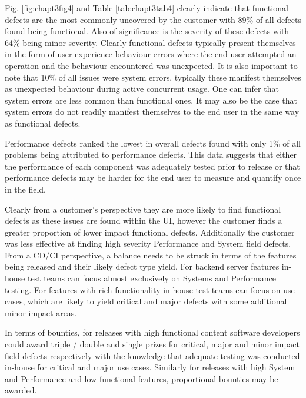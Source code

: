 Fig. \ref{fig:chapt3fig4} and Table \ref{tab:chapt3tab4} clearly indicate that functional defects are the most commonly uncovered by the customer with 89\% of all defects found being functional. Also of significance is the severity of these defects with 64\% being minor severity. Clearly functional defects typically present themselves in the form of user experience behaviour errors where the end user attempted an operation and the behaviour encountered was unexpected. It is also important to note that 10\% of all issues were system errors, typically these manifest themselves as unexpected behaviour during active concurrent usage. One can infer that system errors are less common than functional ones. It may also be the case that system errors do not readily manifest themselves to the end user in the same way as functional defects. \par

Performance defects ranked the lowest in overall defects found with only 1\% of all problems being attributed to performance defects.  This data suggests that either the performance of each component was adequately tested prior to release or that performance defects may be harder for the end user to measure and quantify once in the field.  \par

Clearly from a customer's perspective they are more likely to find functional defects as these issues are found within the UI, however the customer finds a greater proportion of lower impact functional defects. Additionally the customer was less effective at finding high severity Performance and System field defects. From a CD/CI perspective, a balance needs to be struck in terms of the features being released and their likely defect type yield. For backend server features in-house test teams can focus almost exclusively on Systems and Performance testing. For features with rich functionality in-house test teams can focus on use cases, which are likely to yield critical and major defects with some additional minor impact areas. \par

In terms of bounties, for releases with high functional content software developers could award triple / double and single prizes for critical, major and minor impact field defects respectively with the knowledge that adequate testing was conducted in-house for critical and major use cases. Similarly for releases with high System and Performance and low functional features, proportional bounties may be awarded.


